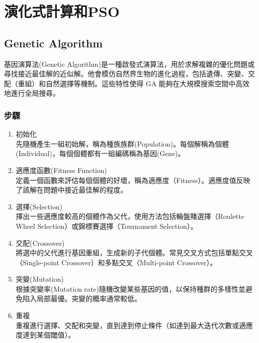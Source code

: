 \chapter{演化式計算和PSO}
\section{Genetic Algorithm}
基因演算法(Genetic Algorithm)是一種啟發式演算法，用於求解複雜的優化問題或尋找接近最佳解的近似解。他會模仿自然界生物的進化過程，包括遺傳、突變、交配（重組）和自然選擇等機制。這些特性使得 GA 能夠在大規模搜索空間中高效地進行全局搜尋。
\subsection{步驟}
\begin{enumerate}
    \item 初始化 \\
        先隨機產生一組初始解，稱為種族族群(Population)。每個解稱為個體(Individual)，每個個體都有一組編碼稱為基因(Gene)。
    \item 適應度函數(Fitness Function) \\
        定義一個函數來評估每個個體的好壞，稱為適應度（Fitness）。適應度值反映了該解在問題中接近最佳解的程度。
    \item 選擇(Selection) \\
        擇出一些適應度較高的個體作為父代，使用方法包括輪盤賭選擇（Roulette Wheel Selection）或錦標賽選擇（Tournament Selection）。
    \item 交配(Crossover) \\
        將選中的父代進行基因重組，生成新的子代個體。常見交叉方式包括單點交叉（Single-point Crossover）和多點交叉（Multi-point Crossover）。
    \item 突變(Mutation) \\
        根據突變率(Mutation rate)隨機改變某些基因的值，以保持種群的多樣性並避免陷入局部最優。突變的概率通常較低。
    \item 重複 \\
        重複進行選擇、交配和突變，直到達到停止條件（如達到最大迭代次數或適應度達到某個閾值）。

\begin{figure}[ht]
\centering
\begin{tikzpicture}[node distance=3cm, auto, >=stealth, 
  every node/.style={draw, align=center, font=\footnotesize, minimum height=1cm, text centered, fill=gray!10}]


\end{tikzpicture}
\end{figure}
\end{enumerate}
